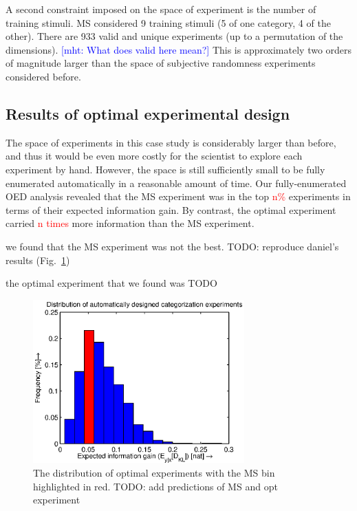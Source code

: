 \documentclass{article}
\newcommand{\red}[1]{\textcolor{Red}{#1}}
\newcommand{\mht}[1]{\textcolor{Blue}{[mht: #1]}}
\newcommand{\cas}[1]{ \textsf{\color{darkgray} \scriptsize #1} }
\begin{document}
A second constraint imposed on the space of experiment is the number of training stimuli. MS considered 9 training stimuli (5 of one category, 4 of the other).
There are 933 valid and unique experiments (up to a permutation of the dimensions).
\mht{What does valid here mean?}
This is approximately two orders of magnitude larger than the space of subjective randomness experiments considered before.




\subsection{Results of optimal experimental design}

The space of experiments in this case study is considerably larger than before, and thus it would be even more costly for the scientist to explore each experiment by hand. However, the space is still sufficiently small to be fully enumerated automatically in a reasonable amount of time.
Our fully-enumerated OED analysis revealed that the MS experiment was in the top \red{n\%} experiments in terms of their expected information gain.
By contrast, the optimal experiment carried \red{n times} more information than the MS experiment.


\cas{we found that the MS experiment was not the best. TODO: reproduce daniel's results (Fig.~\ref{fig:dist})}

\cas{the optimal experiment that we found was TODO}

\begin{figure}[h!]
\centering
\includegraphics[width=3.2in]{img/dist.eps}
\caption{The distribution of optimal experiments with the MS bin highlighted in red. TODO: add predictions of MS and opt experiment}
\label{fig:dist}
\end{figure}
\end{document}
